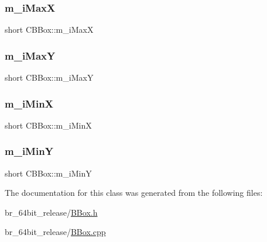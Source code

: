 \subsubsection{\texorpdfstring{m\_iMaxX}{m\_iMaxX}}
{\footnotesize\ttfamily short C\+B\+Box\+::m\+\_\+i\+MaxX\hspace{0.3cm}{\ttfamily [protected]}}

\mbox{\label{classCBBox_a0f866a7a53bed98b77528695a5f68209}} 
\subsubsection{\texorpdfstring{m\_iMaxY}{m\_iMaxY}}
{\footnotesize\ttfamily short C\+B\+Box\+::m\+\_\+i\+MaxY\hspace{0.3cm}{\ttfamily [protected]}}

\mbox{\label{classCBBox_a00c5a1305efcf94cd0b1a4ae04301b46}} 
\subsubsection{\texorpdfstring{m\_iMinX}{m\_iMinX}}
{\footnotesize\ttfamily short C\+B\+Box\+::m\+\_\+i\+MinX\hspace{0.3cm}{\ttfamily [protected]}}

\mbox{\label{classCBBox_afa02f0bfb935a21e343d172c5031de5d}} 
\subsubsection{\texorpdfstring{m\_iMinY}{m\_iMinY}}
{\footnotesize\ttfamily short C\+B\+Box\+::m\+\_\+i\+MinY\hspace{0.3cm}{\ttfamily [protected]}}



The documentation for this class was generated from the following files\+:\begin{DoxyCompactItemize}
\item 
br\+\_\+64bit\+\_\+release/\mbox{\hyperlink{BBox_8h}{B\+Box.\+h}}\item 
br\+\_\+64bit\+\_\+release/\mbox{\hyperlink{BBox_8cpp}{B\+Box.\+cpp}}\end{DoxyCompactItemize}
